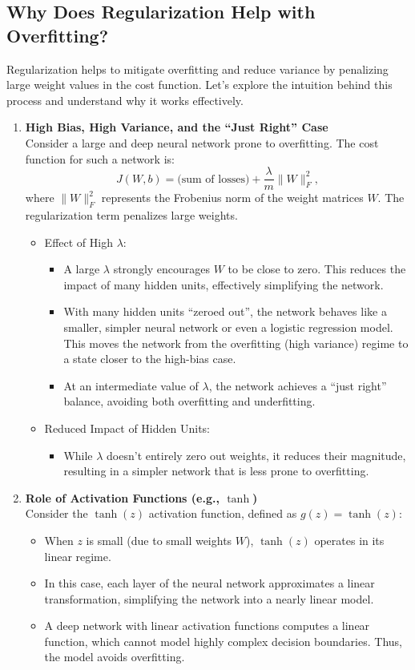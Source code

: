 \documentclass[letterpaper,12pt,notitlepage,twoside]{report}
\begin{document}
\subsection*{Why Does Regularization Help with Overfitting?}
Regularization helps to mitigate overfitting and reduce variance by penalizing large weight values in the cost function. Let's explore the intuition behind this process and understand why it works effectively.
 \begin{enumerate}
\item \textbf{High Bias, High Variance, and the ``Just Right'' Case} \\
Consider a large and deep neural network prone to overfitting. The cost function for such a network is:
\[
J(W, b) = \text{(sum of losses)} + \frac{\lambda}{m} \|W\|_F^2,
\]
where \(\|W\|_F^2\) represents the Frobenius norm of the weight matrices \(W\). The regularization term penalizes large weights.
\begin{itemize}
\item Effect of High \(\lambda\):
	\begin{itemize}[leftmargin=*, nosep]
	\item A large \(\lambda\) strongly encourages \(W\) to be close to zero. This reduces the impact of many hidden units, effectively simplifying the network.
	\item With many hidden units ``zeroed out'', the network behaves like a smaller, simpler neural network or even a logistic regression model. This moves the network from the overfitting (high variance) regime to a state closer to the high-bias case.
	\item At an intermediate value of \(\lambda\), the network achieves a ``just right'' balance, avoiding both overfitting and underfitting.
	\end{itemize}

\item Reduced Impact of Hidden Units:
	\begin{itemize}[leftmargin=*, nosep]
	\item While \(\lambda\) doesn't entirely zero out weights, it reduces their magnitude, resulting in a simpler network that is less prone to overfitting.
	\end{itemize}
\end{itemize}
\item \textbf{Role of Activation Functions (e.g., \(\tanh\))} \\
Consider the \(\tanh(z)\) activation function, defined as \(g(z) = \tanh(z)\):
\begin{itemize}
\item When \(z\) is small (due to small weights \(W\)), \(\tanh(z)\) operates in its linear regime.
\item In this case, each layer of the neural network approximates a linear transformation, simplifying the network into a nearly linear model.
\item A deep network with linear activation functions computes a linear function, which cannot model highly complex decision boundaries. Thus, the model avoids overfitting.
\end{itemize}
\end{enumerate}
\end{document}
